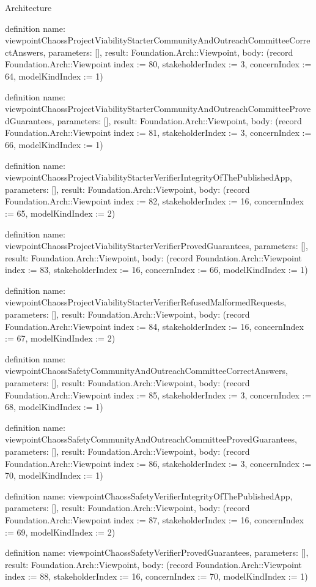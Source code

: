 \begin{lexlean}{Architecture}
\begin{semanticmodule}
definition{
  name: viewpointChaossProjectViabilityStarterCommunityAndOutreachCommitteeCorrectAnswers,
  parameters: [],
  result: Foundation.Arch::Viewpoint,
  body: (record Foundation.Arch::Viewpoint {index := 80, stakeholderIndex := 3, concernIndex := 64, modelKindIndex := 1})
}

definition{
  name: viewpointChaossProjectViabilityStarterCommunityAndOutreachCommitteeProvedGuarantees,
  parameters: [],
  result: Foundation.Arch::Viewpoint,
  body: (record Foundation.Arch::Viewpoint {index := 81, stakeholderIndex := 3, concernIndex := 66, modelKindIndex := 1})
}

definition{
  name: viewpointChaossProjectViabilityStarterVerifierIntegrityOfThePublishedApp,
  parameters: [],
  result: Foundation.Arch::Viewpoint,
  body: (record Foundation.Arch::Viewpoint {index := 82, stakeholderIndex := 16, concernIndex := 65, modelKindIndex := 2})
}

definition{
  name: viewpointChaossProjectViabilityStarterVerifierProvedGuarantees,
  parameters: [],
  result: Foundation.Arch::Viewpoint,
  body: (record Foundation.Arch::Viewpoint {index := 83, stakeholderIndex := 16, concernIndex := 66, modelKindIndex := 1})
}

definition{
  name: viewpointChaossProjectViabilityStarterVerifierRefusedMalformedRequests,
  parameters: [],
  result: Foundation.Arch::Viewpoint,
  body: (record Foundation.Arch::Viewpoint {index := 84, stakeholderIndex := 16, concernIndex := 67, modelKindIndex := 2})
}

definition{
  name: viewpointChaossSafetyCommunityAndOutreachCommitteeCorrectAnswers,
  parameters: [],
  result: Foundation.Arch::Viewpoint,
  body: (record Foundation.Arch::Viewpoint {index := 85, stakeholderIndex := 3, concernIndex := 68, modelKindIndex := 1})
}

definition{
  name: viewpointChaossSafetyCommunityAndOutreachCommitteeProvedGuarantees,
  parameters: [],
  result: Foundation.Arch::Viewpoint,
  body: (record Foundation.Arch::Viewpoint {index := 86, stakeholderIndex := 3, concernIndex := 70, modelKindIndex := 1})
}

definition{
  name: viewpointChaossSafetyVerifierIntegrityOfThePublishedApp,
  parameters: [],
  result: Foundation.Arch::Viewpoint,
  body: (record Foundation.Arch::Viewpoint {index := 87, stakeholderIndex := 16, concernIndex := 69, modelKindIndex := 2})
}

definition{
  name: viewpointChaossSafetyVerifierProvedGuarantees,
  parameters: [],
  result: Foundation.Arch::Viewpoint,
  body: (record Foundation.Arch::Viewpoint {index := 88, stakeholderIndex := 16, concernIndex := 70, modelKindIndex := 1})
}


\end{semanticmodule}
\end{lexlean}

